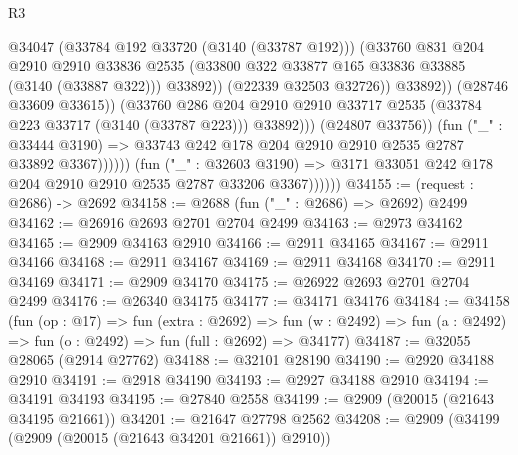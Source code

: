 \begin{lexlean}{R3}
\begin{coremodule}
                                        @34047
                                        (@33784 @192 @33720 (@3140 (@33787 @192)))
                                        (@33760
                                          @831
                                          @204
                                          @2910
                                          @2910
                                          @33836
                                          @2535
                                          (@33800
                                            @322
                                            @33877
                                            @165
                                            @33836
                                            @33885
                                            (@3140 (@33887 @322)))
                                          @33892))
                                      (@22339 @32503 @32726))
                                    @33892))
                                (@28746 @33609 @33615))
                              (@33760
                                @286
                                @204
                                @2910
                                @2910
                                @33717
                                @2535
                                (@33784 @223 @33717 (@3140 (@33787 @223)))
                                @33892)))
                          (@24807 @33756))
                        (fun ("_" : @33444 @3190) =>
                        @33743 @242 @178 @204 @2910 @2910 @2535 @2787 @33892 @3367))))))
              (fun ("_" : @32603 @3190) =>
              @3171 @33051 @242 @178 @204 @2910 @2910 @2535 @2787 @33206 @3367))))))
@34155 := (request : @2686) -> @2692
@34158 := @2688 (fun ("_" : @2686) => @2692) @2499
@34162 := @26916 @2693 @2701 @2704 @2499
@34163 := @2973 @34162
@34165 := @2909 @34163 @2910
@34166 := @2911 @34165
@34167 := @2911 @34166
@34168 := @2911 @34167
@34169 := @2911 @34168
@34170 := @2911 @34169
@34171 := @2909 @34170
@34175 := @26922 @2693 @2701 @2704 @2499
@34176 := @26340 @34175
@34177 := @34171 @34176
@34184 := @34158
    (fun (op : @17) =>
    fun (extra : @2692) =>
    fun (w : @2492) => fun (a : @2492) => fun (o : @2492) => fun (full : @2692) => @34177)
@34187 := @32055 @28065 (@2914 @27762)
@34188 := @32101 @28190
@34190 := @2920 @34188 @2910
@34191 := @2918 @34190
@34193 := @2927 @34188 @2910
@34194 := @34191 @34193
@34195 := @27840 @2558
@34199 := @2909 (@20015 (@21643 @34195 @21661))
@34201 := @21647 @27798 @2562
@34208 := @2909 (@34199 (@2909 (@20015 (@21643 @34201 @21661)) @2910))

\end{coremodule}
\end{lexlean}
